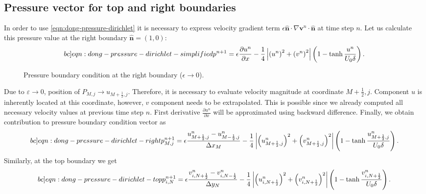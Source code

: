 \documentclass{article}
\numberwithin{equation}{section}
\begin{document}
\subsection{Pressure vector for top and right boundaries}
In order to use \cref{eqn:dong-pressure-dirichlet} it is necessary to express velocity gradient term $\epsilon \boldsymbol{\hat{n}} \cdot \nabla \boldsymbol{v}^n \cdot \boldsymbol{\hat{n}}$ at time step $n$. 
Let us calculate this pressure value at the right boundary $\boldsymbol{\hat{n}}=\left( 1, 0 \right)$:
\begin{equation}\label[bc]{eqn:dong-pressure-dirichlet-simplified}
	p^{n+1}=\epsilon \frac{\partial u^n}{\partial x}-\frac{1}{4}\left|\left({u}^n\right)^2+\left({v}^n\right)^2\right| \left(1-\operatorname{tanh}\frac{u^n}{U_0\delta}\right).
\end{equation}
\begin{figure}[H] %
  \caption{Pressure boundary condition at the right boundary ($\epsilon\to 0$).}\label{fig:luxx-bottom}
\end{figure}
Due to $\varepsilon\to 0$, position of $P_{M,j}\to u_{M+\frac{1}{2},j}$. Therefore, it is necessary to evaluate velocity magnitude at coordinate $M+\frac{1}{2},j$. Component $u$ is inherently located at this coordinate, however, $v$ component needs to be extrapolated. This is possible since we already computed all necessary velocity values at previous time step $n$. First derivative $\frac{\partial u^n}{\partial x}$ will be approximated using backward difference. Finally, we obtain contribution to pressure boundary condition vector as
\begin{equation}\label[bc]{eqn:dong-pressure-dirichlet-right}
	p^{n+1}_{M,j}=\epsilon \frac{u^n_{M+\frac{1}{2},j}-u^n_{M-\frac{1}{2},j}}{\Delta x_M}-\frac{1}{4}\left|\left({u}_{M+\frac{1}{2},j}^n\right)^2+\left({v}_{M+\frac{1}{2},j}^n\right)^2\right| \left(1-\operatorname{tanh}\frac{u_{M+\frac{1}{2},j}^n}{U_0\delta}\right).
\end{equation}
Similarly, at the top boundary we get
\begin{equation}\label[bc]{eqn:dong-pressure-dirichlet-top}
	p^{n+1}_{i,N}=\epsilon \frac{v^n_{i,N+\frac{1}{2}}-v^n_{i,N-\frac{1}{2}}}{\Delta y_N}-\frac{1}{4}\left|\left({u}_{i,N+\frac{1}{2}}^n\right)^2+\left({v}_{i,N+\frac{1}{2}}^n\right)^2\right| \left(1-\operatorname{tanh}\frac{v_{i,N+\frac{1}{2}}^n}{U_0\delta}\right).
\end{equation}
\end{document}
